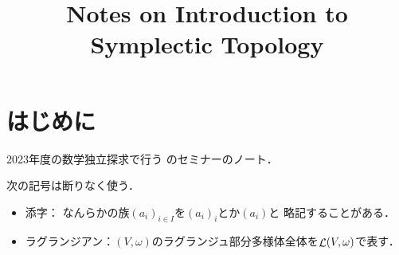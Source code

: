 \title{Notes on Introduction to Symplectic Topology}
\author{}
\date{}

\maketitle

\chapter*{はじめに}
2023年度の数学独立探求で行う
\cite{MS17}のセミナーのノート．

次の記号は断りなく使う．
\begin{itemize}
    \item 添字：
    なんらかの族$(a_i)_{i\in I}$を$(a_i)_i$とか$(a_i)$と
    略記することがある．
    \item ラグランジアン：\((
        V,\omega
    )\)のラグランジュ部分多様体全体を\(\mathop{\mathcal{L}}(V,\omega)\)で表す．
\end{itemize}
\begin{comment}
\chapter*{第3版の前書き}

本書の第3版における目標は2点ある．
一つは，誤りを直したり色々な箇所の説明を改良したことで，
これにより，
シンプレクティックトポロジーという分野に
初めて触れるという大学院生にとって，
本文がより馴染みやすいものになることを期待する．
もう一方はさまざまな箇所を書き改め，
この四半世紀を通して広大になり，他の分野との繋がりも多くなった
この分野における多くの新発展について説明を加えた．
これによって，本書がこの分野の研究者にとっても有用になることを期待する．



\chapter*{序論}
シンプレクティックトポロジーの歴史は長い．
古典力学と幾何光学にルーツがあり，
現代に於いては，数学と理論物理における他の分野と多くの関わりをもつ．
それは力学系，低次元トポロジー，代数幾何，複素幾何，表現論，
ホモロジー代数といったものから，
古典力学，量子力学，弦理論，ミラー対称性まで多岐にわたる．
この分野の起源のひとつは，
1次元変分問題におけるオイラーラグランジュ方程式から出てくる
運動方程式の研究にある．
ルジャンドル変換から導かれるハミルトンの定式化から，
運動方程式のハミルトン形式を保つ\emph{正準変換}の概念が出てくる．


\end{comment}

